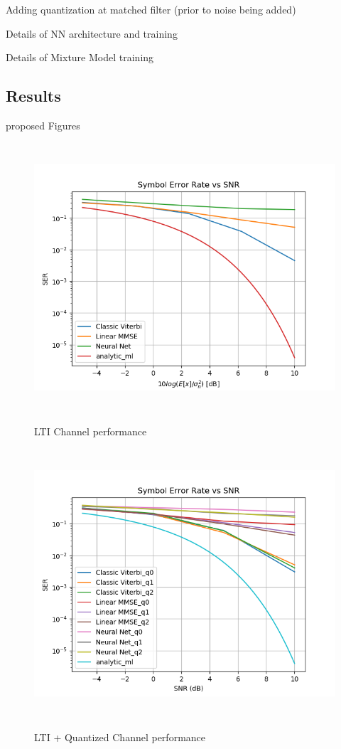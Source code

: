 \documentclass[12pt,a4paper]{article}
\begin{document}
Adding quantization at matched filter (prior to noise being added)


Details of NN architecture and training

Details of Mixture Model training

\subsection{Results}
proposed Figures
\begin{figure}[H]
	  \caption{LTI Channel performance}
	\includegraphics[width=\textwidth,height = 10cm]{results/lti_normal}
	  \label{fig:LTI Channel}
\end{figure}

\begin{figure}[H]
	  \caption{LTI + Quantized Channel performance}
	\includegraphics[width=\textwidth,height = 10cm]{results/lti_quantized}
	  \label{fig:LTI_quant Channel}
\end{figure}
\end{document}
